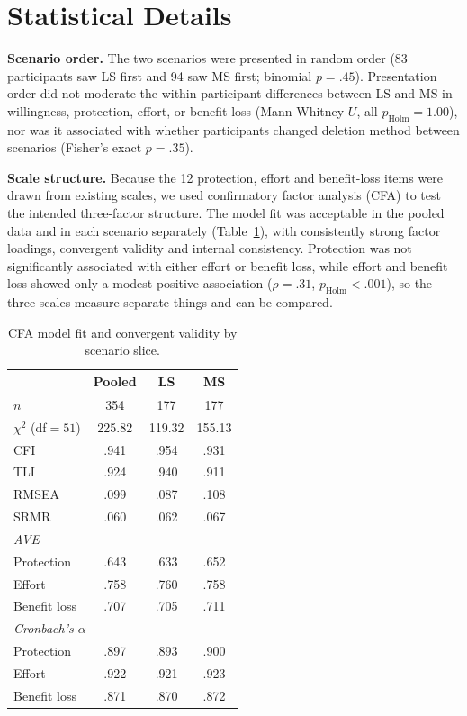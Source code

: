 \documentclass[conference,compsoc]{IEEEtran}
\begin{document}
\appendix

\section{Statistical Details}
\label{sec:stats-details}

\textbf{Scenario order.} The two scenarios were presented in random order (83 participants saw LS first and 94 saw MS first; binomial $p=.45$). Presentation order did not moderate the within-participant differences between LS and MS in willingness, protection, effort, or benefit loss (Mann-Whitney $U$, all $p_{\mathrm{Holm}}=1.00$), nor was it associated with whether participants changed deletion method between scenarios (Fisher's exact $p=.35$).

\textbf{Scale structure.} Because the 12 protection, effort and benefit-loss items were drawn from existing scales, we used confirmatory factor analysis (CFA) to test the intended three-factor structure. The model fit was acceptable in the pooled data and in each scenario separately (Table~\ref{tab:cfa-fit}), with consistently strong factor loadings, convergent validity and internal consistency. Protection was not significantly associated with either effort or benefit loss, while effort and benefit loss showed only a modest positive association ($\rho=.31$, $p_{\mathrm{Holm}}<.001$), so the three scales measure separate things and can be compared.

\begin{table}[t]
\centering
\caption{CFA model fit and convergent validity by scenario slice.}
\label{tab:cfa-fit}
\small
\setlength{\tabcolsep}{4pt}
\begin{tabular}{lccc}
\toprule
 & Pooled & LS & MS \\
\midrule
$n$ & 354 & 177 & 177 \\
$\chi^2$ (df${}=51$) & 225.82 & 119.32 & 155.13 \\
CFI & .941 & .954 & .931 \\
TLI & .924 & .940 & .911 \\
RMSEA & .099 & .087 & .108 \\
SRMR & .060 & .062 & .067 \\
\midrule
\multicolumn{4}{l}{\textit{AVE}} \\
\quad Protection & .643 & .633 & .652 \\
\quad Effort & .758 & .760 & .758 \\
\quad Benefit loss & .707 & .705 & .711 \\
\midrule
\multicolumn{4}{l}{\textit{Cronbach's $\alpha$}} \\
\quad Protection & .897 & .893 & .900 \\
\quad Effort & .922 & .921 & .923 \\
\quad Benefit loss & .871 & .870 & .872 \\
\bottomrule
\end{tabular}
\end{table}
\end{document}
